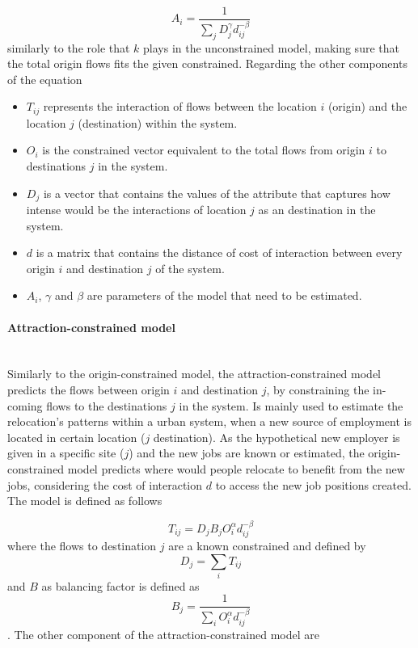 \documentclass{article}
\begin{document}
\[A_i = \frac{1}{\sum_j D_j^\gamma d_{ij}^{-\beta}}\] similarly to the role that $k$ plays in the unconstrained model, making sure that the total origin flows fits the given constrained.  Regarding the other components of the equation

\begin{itemize}
  \item $T_{ij}$ represents the interaction of flows between the location $i$ (origin) and the location $j$ (destination) within the system. 
  \item $O_{i}$ is the constrained vector equivalent to the total flows from origin $i$ to destinations $j$ in the system.
  \item $D_{j}$ is a vector that contains the values of the attribute that captures how intense would be the interactions of location $j$ as an destination in the system.
    \item $d$ is a matrix that contains the distance of cost of interaction between every origin $i$ and destination $j$ of the system.
    \item $A_{i}$, $\gamma$ and $\beta$ are parameters of the model that need to be estimated.
\end{itemize}

\paragraph{Attraction-constrained model}\mbox{}\\

Similarly to the origin-constrained model, the attraction-constrained model predicts the flows between origin $i$ and destination $j$, by constraining the in-coming flows to the destinations $j$ in the system. Is mainly used to estimate the relocation's patterns within a urban system, when a new source of employment is located in certain location ($j$ destination). As the hypothetical new employer is given in a specific site ($j$) and the new jobs are known or estimated, the origin-constrained model predicts where would people relocate to benefit from the new jobs, considering the  cost of interaction $d$ to access the new job positions created. The model is defined as follows

\[T_{ij} = D_j B_j O_i^\alpha d_{ij}^{-\beta}\] where the flows to destination $j$ are a known constrained and defined by \[D_j = \sum_i T_{ij}\] and $B$ as balancing factor is defined as \[B_j = \frac{1}{\sum_i O_i^\alpha d_{ij}^{-\beta}}\]. The other component of the attraction-constrained model are
\end{document}
